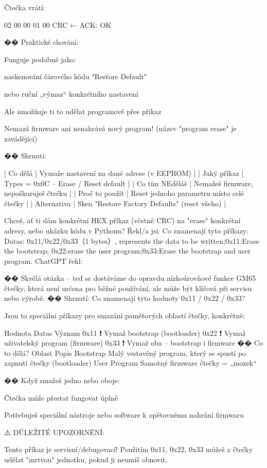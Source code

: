 Čtečka vrátí:

02 00 00 01 00 CRC  ← ACK: OK

�� Praktické chování:

    Funguje podobně jako:

        naskenování čárového kódu "Restore Default"

        nebo ruční „výmaz“ konkrétního nastavení

    Ale umožňuje ti to udělat programově přes příkaz

    Nemazá firmware ani nenahrává nový program! (název "program erase" je zavádějící)

�� Shrnutí:

| Co dělá | Vymaže nastavení na dané adrese (v EEPROM) | | Jaký příkaz | Types = 0x0C – Erase / Reset default | | Co tím NEděláš | Nemažeš firmware, nepoškozuješ čtečku | | Proč to použít | Reset jednoho parametru místo celé čtečky | | Alternativa | Sken "Restore Factory Defaults" (reset všeho) |

Chceš, ať ti dám konkrétní HEX příkaz (včetně CRC) na "erase" konkrétní adresy, nebo ukázku kódu v Pythonu?
Řekl/a jsi:
Co znamenají tyto příkazy: Datas: 0x11/0x22/0x33（1 bytes）, represents the data to be written;0x11:Erase the bootstrap;
0x22:erase the user program;0x33:Erase the bootstrap and user program.
ChatGPT řekl:

�� Skvělá otázka – teď se dostáváme do opravdu nízkoúrovňové funkce GM65 čtečky, která není určena pro běžné používání, ale může být klíčová při servisu nebo výrobě.
�� Shrnutí: Co znamenají tyto hodnoty 0x11 / 0x22 / 0x33?

    Jsou to speciální příkazy pro smazání paměťových oblastí čtečky, konkrétně:

Hodnota Datas	Význam
0x11	❗ Vymaž bootstrap (bootloader)
0x22	❗ Vymaž uživatelský program (firmware)
0x33	❗ Vymaž oba – bootstrap i firmware
�� Co to dělá?
Oblast	Popis
Bootstrap	Malý vestavěný program, který se spustí po zapnutí čtečky (bootloader)
User Program	Samotný firmware čtečky = „mozek“

�� Když smažeš jedno nebo oboje:

    Čtečka může přestat fungovat úplně

    Potřebuješ speciální nástroje nebo software k opětovnému nahrání firmwaru

⚠️ DŮLEŽITÉ UPOZORNĚNÍ:

    Tento příkaz je servisní/debugovací!
    Použitím 0x11, 0x22, 0x33 můžeš z čtečky udělat "mrtvou" jednotku, pokud ji neumíš obnovit.

